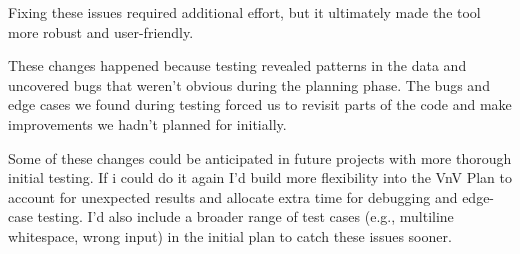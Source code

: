 \documentclass[12pt, titlepage]{article}
\begin{document}
\begin{itemize}
    Fixing these issues required additional effort, but it ultimately
    made the tool more robust and user-friendly.


    These changes happened because testing revealed patterns in the data
    and uncovered bugs that weren't obvious during the planning phase.
    The bugs and edge cases we found during testing forced us to
    revisit parts of the code and make improvements we hadn't planned
    for initially.

    Some of these changes could be anticipated in future projects
    with more thorough initial testing.
    If i could do it again I'd build more flexibility into the VnV
    Plan to account for unexpected results and allocate extra time
    for debugging and edge-case testing. I’d also include a broader
    range of test cases (e.g., multiline whitespace, wrong input) in
    the initial plan to catch these issues sooner.

\end{itemize}
\end{document}
